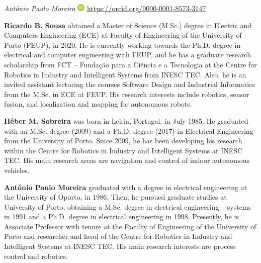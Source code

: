 \documentclass[10pt,a4paper,notitlepage,twocolumn,oneside]{article}
\begin{document}
\noindent \textit{Ant\'{o}nio Paulo Moreira} \includegraphics[width=1em]{orcid.pdf} \href{https://orcid.org/0000-0001-8573-3147}{https://orcid.org/0000-0001-8573-3147}




\printbibliography

%
%




\newpage

\noindent \textbf{Ricardo B. Sousa} obtained a Master of Science (M.Sc.) degree in Electric and Computers Engineering (ECE) at Faculty of Engineering of the University of Porto (FEUP), in 2020.
He is currently working towards the Ph.D. degree in electrical and computer engineering with FEUP, and he has a graduate research scholarship from FCT -- Fundação para a Ciência e a Tecnologia at the Centre for Robotics in Industry and Intelligent Systems from INESC TEC.
Also, he is an invited assistant lecturing the courses Software Design and Industrial Informatics from the M.Sc. in ECE at FEUP.
His research interests include robotics, sensor fusion, and localization and mapping for autonomous robots.

\vspace{1em}

\noindent \textbf{H\'{e}ber M. Sobreira} was born in Leiria, Portugal, in July 1985. He graduated with an M.Sc. degree (2009) and a Ph.D. degree (2017) in Electrical Engineering from the University of Porto. Since 2009, he has been developing his research within the Centre for Robotics in Industry and Intelligent Systems at INESC TEC. His main research areas are navigation and control of indoor autonomous vehicles.

\vspace{1em}

\noindent \textbf{Ant\'{o}nio Paulo Moreira} graduated with a degree in electrical engineering at the University of Oporto, in 1986. Then, he pursued graduate studies at University of Porto, obtaining a M.Sc. degree in electrical engineering -- systems in 1991 and a Ph.D. degree in electrical engineering in 1998. Presently, he is Associate Professor with tenure at the Faculty of Engineering of the University of Porto and researcher and head of the Centre for Robotics in Industry and Intelligent Systems at INESC TEC. His main research interests are process control and robotics.




\cleardoublepage


\end{document}
